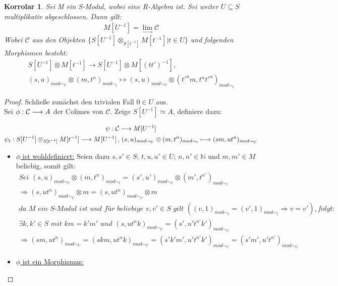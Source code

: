 \documentclass[10pt,a4paper]{report}
\newcommand{\comment}[1]{}
\newcounter{Aussage}[chapter]
\newtheorem{korrolar}[Aussage]{Korrolar}
\newcommand{\functionfront}[3]{\nolinebreak{#1:#2 \longrightarrow #3}}
\newcommand{\function}[5]{\nolinebreak{#1:#2 \longrightarrow #3 \, , \, #4 \longmapsto #5}}
\newcommand{\Tensor}[3]{#1 \otimes_{#2} #3}
\newcommand{\tensor}[3]{#1 \otimes #3}
\newcommand{\lok}[2]{#1 [#2^{-1}]}
\newcommand{\loke}[3]{(#1,#2)_{mod\sim_{#3}}}
\newcommand{\colimes}[0]{\lim\limits_{ \longrightarrow }}
\begin{document}
\begin{korrolar}\comment{\label{Lokalisierung von Moduln als Kolimes}}
Sei M ein S-Modul, wobei eine R-Algebra ist. Sei weiter $U \subseteq S$ multiplikativ abgeschlossen. Dann gilt:
\begin{gather*}
\lok{M}{U} = \colimes \mathcal{C}
\end{gather*}
Wobei $\mathcal{C}$ aus den Objekten $\lbrace \Tensor{\lok{S}{U}}{\lok{S}{t}}{\lok{M}{t}} \vert t \in U \rbrace$ und folgenden Morphismen besteht:
\begin{gather*}
\tensor{\lok{S}{U}}{\lok{S}{t}}{\lok{M}{t}} \longrightarrow
\tensor{\lok{S}{U}}{\lok{S}{(tt')}}{\lok{M}{(tt')}} ,\\
\tensor{\loke{s}{u}{U}}{\lok{S}{t}}{\loke{m}{t^n}{t}} \longmapsto
\tensor{\loke{s}{u}{U}}{\lok{S}{t}}{\loke{t'^nm}{t^nt'^n}{t}} 
\end{gather*}
\end{korrolar}
\begin{proof}
Schließe zunächst den trivialen Fall $0 \in U$ aus.\\
Sei $\functionfront{\phi}{\mathcal{C}}{A}$ der Colimes von $\mathcal{C}$. Zeige $\lok{S}{U} \simeq A$, definiere dazu:

\begin{gather*}
\functionfront{\psi}{\mathcal{C}}{\lok{M}{U}} \\
\comment{
\function{\psi_{\Tensor{\lok{S}{U}}{\lok{S}{t}}{\lok{M}{t}}}}{\Tensor{\lok{S}{U}}{\lok{S}{t}}{\lok{M}{t}}}{\lok{M}{U}}{\tensor{\loke{s}{u}{U}}{\lok{S}{t}}{\loke{m}{t^n}{t}}}{\loke{sm}{ut^n}{U}} \\
}
\function{\psi_{t}}{\Tensor{\lok{S}{U}}{\lok{S}{t}}{\lok{M}{t}}}{\lok{M}{U}}{\tensor{\loke{s}{u}{U}}{\lok{S}{t}}{\loke{m}{t^n}{t}}}{\loke{sm}{ut^n}{U}}
\end{gather*}
\begin{itemize}
\item \underline{$\phi$ ist wohldefiniert:} Seien dazu $s,s' \in S ; \, t,u,u' \in U ; \, n,n' \in \mathbb{N}$ und $m,m' \in M$ beliebig, somit gilt:
\begin{gather*}
\textit{Sei }\tensor{\loke{s}{u}{U}}{\lok{S}{t}}{\loke{m}{t^n}{t}} = \tensor{\loke{s'}{u'}{U}}{\lok{S}{t}}{\loke{m'}{t^{n'}}{t}} \\
\Rightarrow \tensor{\loke{s}{ut^n}{U}}{\lok{S}{t}}{m} = \tensor{\loke{s}{ut^n}{U}}{\lok{S}{t}}{m} \\
\textit{da M ein S-Modul ist und für beliebige $v,v' \in S$ gilt } (\loke{v}{1}{t} = \loke{v'}{1}{t} \Rightarrow v = v') { ,folgt:}\\
\exists k,k' \in S \textit{ mit } km = k'm' \textit{ und } \loke{s}{ut^nk}{U} = \loke{s'}{u't^{n'}k'}{U} \\
\Rightarrow \loke{sm}{ut^n}{U} = \loke{skm}{ut^nk}{U} = \loke{s'k'm'}{u't^{n'}k'}{U} =\loke{s'm'}{u't^{n'}}{U} 
\end{gather*}
\item \underline{$\phi$ ist ein Morphismus:}
\end{itemize}

\end{proof}
\end{document}
